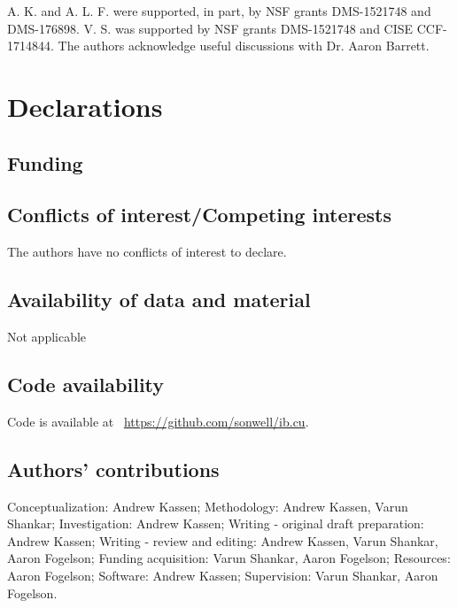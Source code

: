 \begin{acknowledgements}
A. K. and A. L. F. were supported, in part, by NSF grants DMS-1521748 and DMS-176898.
V. S. was supported by NSF grants DMS-1521748 and CISE CCF-1714844. The authors
acknowledge useful discussions with Dr. Aaron Barrett.
\end{acknowledgements}

{}

\section*{Declarations}
\subsection*{Funding}
\subsection*{Conflicts of interest/Competing interests}
The authors have no conflicts of interest to declare.
\subsection*{Availability of data and material} Not applicable
\subsection*{Code availability} Code is available at~%
\url{https://github.com/sonwell/ib.cu}.
\subsection*{Authors' contributions}
Conceptualization: Andrew Kassen;
Methodology: Andrew Kassen, Varun Shankar;
Investigation: Andrew Kassen;
Writing - original draft preparation: Andrew Kassen;
Writing - review and editing: Andrew Kassen, Varun Shankar, Aaron Fogelson;
Funding acquisition: Varun Shankar, Aaron Fogelson;
Resources: Aaron Fogelson;
Software: Andrew Kassen;
Supervision: Varun Shankar, Aaron Fogelson.


